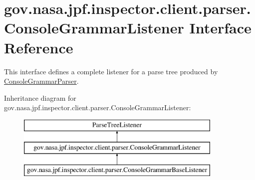 \hypertarget{interfacegov_1_1nasa_1_1jpf_1_1inspector_1_1client_1_1parser_1_1_console_grammar_listener}{}\section{gov.\+nasa.\+jpf.\+inspector.\+client.\+parser.\+Console\+Grammar\+Listener Interface Reference}
\label{interfacegov_1_1nasa_1_1jpf_1_1inspector_1_1client_1_1parser_1_1_console_grammar_listener}


This interface defines a complete listener for a parse tree produced by \hyperlink{classgov_1_1nasa_1_1jpf_1_1inspector_1_1client_1_1parser_1_1_console_grammar_parser}{Console\+Grammar\+Parser}.  


Inheritance diagram for gov.\+nasa.\+jpf.\+inspector.\+client.\+parser.\+Console\+Grammar\+Listener\+:\begin{figure}[H]
\begin{center}
\leavevmode
\includegraphics[height=3.000000cm]{interfacegov_1_1nasa_1_1jpf_1_1inspector_1_1client_1_1parser_1_1_console_grammar_listener}
\end{center}
\end{figure}
